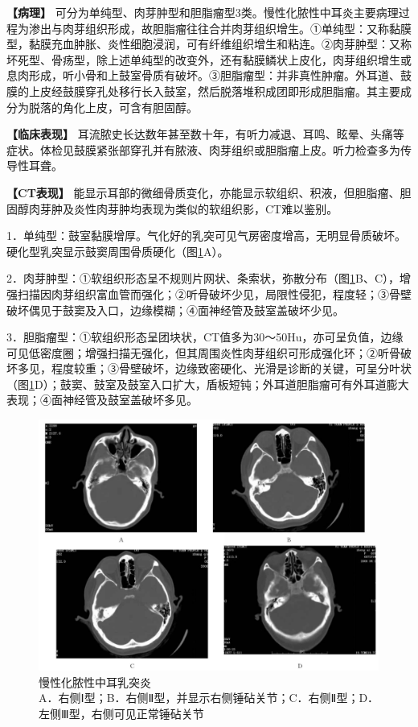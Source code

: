 \textbf{【病理】}
可分为单纯型、肉芽肿型和胆脂瘤型3类。慢性化脓性中耳炎主要病理过程为渗出与肉芽组织形成，故胆脂瘤往往合并肉芽组织增生。①单纯型：又称黏膜型，黏膜充血肿胀、炎性细胞浸润，可有纤维组织增生和粘连。②肉芽肿型：又称坏死型、骨疡型，除上述单纯型的改变外，还有黏膜鳞状上皮化，肉芽组织增生或息肉形成，听小骨和上鼓室骨质有破坏。③胆脂瘤型：并非真性肿瘤。外耳道、鼓膜的上皮经鼓膜穿孔处移行长入鼓室，然后脱落堆积成团即形成胆脂瘤。其主要成分为脱落的角化上皮，可含有胆固醇。

\textbf{【临床表现】}
耳流脓史长达数年甚至数十年，有听力减退、耳鸣、眩晕、头痛等症状。体检见鼓膜紧张部穿孔并有脓液、肉芽组织或胆脂瘤上皮。听力检查多为传导性耳聋。

\textbf{【CT表现】}
能显示耳部的微细骨质变化，亦能显示软组织、积液，但胆脂瘤、胆固醇肉芽肿及炎性肉芽肿均表现为类似的软组织影，CT难以鉴别。

1．单纯型：鼓室黏膜增厚。气化好的乳突可见气房密度增高，无明显骨质破坏。硬化型乳突显示鼓窦周围骨质硬化（图\ref{fig4-4}A）。

2．肉芽肿型：①软组织形态呈不规则片网状、条索状，弥散分布（图\ref{fig4-4}B、C），增强扫描因肉芽组织富血管而强化；②听骨破坏少见，局限性侵犯，程度轻；③骨壁破坏偶见于鼓窦及入口，边缘模糊；④面神经管及鼓室盖破坏少见。

3．胆脂瘤型：①软组织形态呈团块状，CT值多为30～50Hu，亦可呈负值，边缘可见低密度圈；增强扫描无强化，但其周围炎性肉芽组织可形成强化环；②听骨破坏多见，程度较重；③骨壁破坏，边缘致密硬化、光滑是诊断的关键，可呈分叶状（图\ref{fig4-4}D）；鼓窦、鼓室及鼓室入口扩大，盾板短钝；外耳道胆脂瘤可有外耳道膨大表现；④面神经管及鼓室盖破坏多见。

\begin{figure}[!htbp]
 \centering
 \includegraphics[width=.7\textwidth,height=\textheight,keepaspectratio]{./images/Image00120.jpg}
 \captionsetup{justification=centering}
 \caption{慢性化脓性中耳乳突炎\\{\small A．右侧Ⅰ型；B．右侧Ⅱ型，并显示右侧锤砧关节；C．右侧Ⅱ型；D．左侧Ⅲ型，右侧可见正常锤砧关节}}
 \label{fig4-4}
  \end{figure} 

